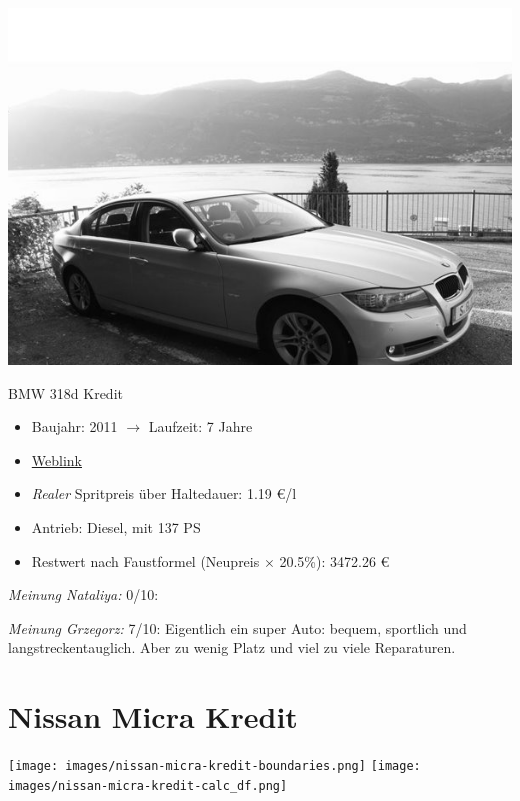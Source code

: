 \documentclass[landscape, DIV=99, 14pt]{scrartcl}
\begin{document}
\pagebreak
\begin{center}
\includegraphics[width=0.9\columnwidth]{cars/bmw-3er-maximus.png}

BMW 318d Kredit
\end{center}

\begin{itemize}
    \item Baujahr: 2011 $\rightarrow$ Laufzeit: 7 Jahre
    \item \href{https://de.wikipedia.org/wiki/BMW_E90}{Weblink}
    \item \emph{Realer} Spritpreis \"uber Haltedauer: 1.19 \euro{}/l
    \item Antrieb: Diesel, mit 137 PS
    \item Restwert nach Faustformel (Neupreis $\times$ 20.5\%): 3472.26 \euro{}
\end{itemize}

\begin{small}
\emph{Meinung Nataliya:} 0/10: 
        
\emph{Meinung Grzegorz:} 7/10: Eigentlich ein super Auto: bequem, sportlich und langstreckentauglich. Aber zu wenig Platz und viel zu viele Reparaturen.
\end{small}

\pagebreak


\twocolumn

\section*{Nissan Micra Kredit}
\begin{center}
\texttt{[image: images/nissan-micra-kredit-boundaries.png]}
\null
\vspace{0.5cm}
\texttt{[image: images/nissan-micra-kredit-calc\_df.png]}
\end{center}
\end{document}
